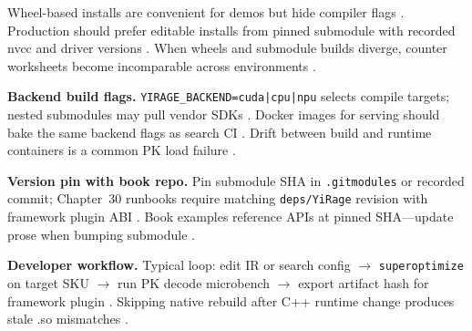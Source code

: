 Wheel-based installs are convenient for demos but hide compiler flags \citep{yirage2026,chen2020compilerbasedhardw,patel2025llminference,dlbook}. Production should prefer editable installs from pinned submodule with recorded nvcc and driver versions \citep{yirage2026,chen2020compilerbasedhardw,patel2025llminference,dlbook}. When wheels and submodule builds diverge, counter worksheets become incomparable across environments \citep{taxbreak2026,memoryfloor2026,patel2025llminference,yirage2026,chen2020compilerbasedhardw,dlbook}.

\textbf{Backend build flags.} \texttt{YIRAGE\_BACKEND=cuda|cpu|npu} selects compile targets; nested submodules may pull vendor SDKs \citep{yirage2026,chen2020compilerbasedhardw,amd2024xdna,amd2024aie,patel2025llminference,dlbook,semianalysis2024tma,taxbreak2026,memoryfloor2026,kwon2023vllm,liu2024deepseekv3,nvidia2024cudagraphs,dao2022flashattention,dao2023flashdecoding,nvidia2022hopper,dlbook}. Docker images for serving should bake the same backend flags as search CI \citep{yirage2026,chen2020compilerbasedhardw,patel2025llminference,kwon2023vllm,taxbreak2026,memoryfloor2026,dlbook}. Drift between build and runtime containers is a common PK load failure \citep{yirage2026,chen2020compilerbasedhardw,patel2025llminference,dlbook}.

\textbf{Version pin with book repo.} Pin submodule SHA in \texttt{.gitmodules} or recorded commit; Chapter~30 runbooks require matching \texttt{deps/YiRage} revision with framework plugin ABI \citep{yirage2026,chen2020compilerbasedhardw,kwon2023vllm,patel2025llminference,taxbreak2026,memoryfloor2026,dlbook,liu2024deepseekv3,nvidia2024cudagraphs,dao2022flashattention,semianalysis2024tma,amd2024xdna,amd2024aie,dao2023flashdecoding,nvidia2022hopper,dlbook}. Book examples reference APIs at pinned SHA---update prose when bumping submodule \citep{yirage2026,chen2020compilerbasedhardw,patel2025llminference,dlbook}.

\textbf{Developer workflow.} Typical loop: edit IR or search config $\rightarrow$ \texttt{superoptimize} on target SKU $\rightarrow$ run PK decode microbench $\rightarrow$ export artifact hash for framework plugin \citep{yirage2026,chen2020compilerbasedhardw,patel2025llminference,taxbreak2026,memoryfloor2026,kwon2023vllm,nvidia2024cudagraphs,dao2022flashattention,liu2024deepseekv3,semianalysis2024tma,amd2024xdna,amd2024aie,dao2023flashdecoding,nvidia2022hopper,dlbook}. Skipping native rebuild after C++ runtime change produces stale .so mismatches \citep{yirage2026,chen2020compilerbasedhardw,patel2025llminference,dlbook}.

